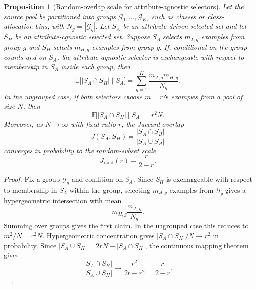 \documentclass{article}
\newtheorem{proposition}{Proposition}
\begin{document}
\begin{proposition}[Random-overlap scale for attribute-agnostic selectors]
\label{prop:random-overlap-scale}
Let the source pool be partitioned into groups $\mathcal{G}_1,\ldots,\mathcal{G}_K$, such as classes or class-allocation bins, with $N_g=|\mathcal{G}_g|$. Let $S_A$ be an attribute-driven selected set and let $S_H$ be an attribute-agnostic selected set. Suppose $S_A$ selects $m_{A,g}$ examples from group $g$ and $S_H$ selects $m_{H,g}$ examples from group $g$. If, conditional on the group counts and on $S_A$, the attribute-agnostic selector is exchangeable with respect to membership in $S_A$ inside each group, then
\begin{equation}
\mathbb{E}\big[|S_A\cap S_H|\mid S_A\big]
=
\sum_{g=1}^K \frac{m_{A,g}m_{H,g}}{N_g}.
\end{equation}
In the ungrouped case, if both selectors choose $m=rN$ examples from a pool of size $N$, then
\begin{equation}
\mathbb{E}\big[|S_A\cap S_H|\mid S_A\big]=r^2N.
\end{equation}
Moreover, as $N\rightarrow\infty$ with fixed ratio $r$, the Jaccard overlap
\begin{equation}
J(S_A,S_H)=\frac{|S_A\cap S_H|}{|S_A\cup S_H|}
\end{equation}
converges in probability to the random-subset scale
\begin{equation}
J_{\mathrm{rand}}(r)=\frac{r}{2-r}.
\end{equation}
\end{proposition}

\begin{proof}
Fix a group $\mathcal{G}_g$ and condition on $S_A$. Since $S_H$ is exchangeable with respect to membership in $S_A$ within the group, selecting $m_{H,g}$ examples from $\mathcal{G}_g$ gives a hypergeometric intersection with mean
\begin{equation}
m_{H,g}\frac{m_{A,g}}{N_g}.
\end{equation}
Summing over groups gives the first claim. In the ungrouped case this reduces to $m^2/N=r^2N$. Hypergeometric concentration gives $|S_A\cap S_H|/N\rightarrow r^2$ in probability. Since $|S_A\cup S_H|=2rN-|S_A\cap S_H|$, the continuous mapping theorem gives
\begin{equation}
\frac{|S_A\cap S_H|}{|S_A\cup S_H|}
\rightarrow
\frac{r^2}{2r-r^2}
=
\frac{r}{2-r}.
\end{equation}
\end{proof}
\end{document}
